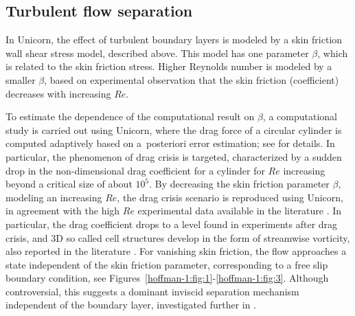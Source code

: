 \subsection{Turbulent flow separation}

In Unicorn, the effect of turbulent boundary layers is modeled by a
skin friction wall shear stress model, described above. This model has
one parameter $\beta$, which is related to the skin friction stress.
Higher Reynolds number is modeled by a smaller $\beta$, based on
experimental observation that the skin friction (coefficient)
decreases with increasing $Re$.

To estimate the dependence of the computational result on $\beta$, a
computational study is carried out using Unicorn, where the drag force
of a circular cylinder is computed adaptively based on a~posteriori
error estimation; see \citet{HoffmanJansson2009} for details. In
particular, the phenomenon of drag crisis is targeted, characterized
by a sudden drop in the non-dimensional drag coefficient for a
cylinder for $Re$ increasing beyond a critical size of about
$10^5$. By decreasing the skin friction parameter $\beta$, modeling an
increasing $Re$, the drag crisis scenario is reproduced using Unicorn,
in agreement with the high $Re$ experimental data available in the
literature \citep{Zdravkovich2003}. In particular, the drag
coefficient drops to a level found in experiments after drag crisis,
and 3D so called cell structures develop in the form of streamwise
vorticity, also reported in the literature \citep{Zdravkovich2003}.
For vanishing skin friction, the flow approaches a state independent
of the skin friction parameter, corresponding to a free slip boundary
condition, see Figures~\ref{hoffman-1:fig:1}-\ref{hoffman-1:fig:3}. Although
controversial, this suggests a dominant inviscid separation mechanism
independent of the boundary layer, investigated further in
\citet{HoffmanJohnson2008b,HoffmanJansson2009}.

